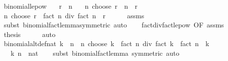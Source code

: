 \begin{isabellebody}
\isamarkupfalse%
\ binomial{\isacharunderscore}{\kern0pt}le{\isacharunderscore}{\kern0pt}pow{\isacharcolon}{\kern0pt}\isanewline
\ \ \ {\isachardoublequoteopen}r\ {\isasymle}\ n{\isachardoublequoteclose}\isanewline
\ \ \ {\isachardoublequoteopen}n\ choose\ r\ {\isasymle}\ n\ {\isacharcircum}{\kern0pt}\ r{\isachardoublequoteclose}\isanewline
%
\isadelimproof
%
\endisadelimproof
%
\isatagproof
{}\isamarkupfalse%
\ {\isacharminus}{\kern0pt}\isanewline
\ \ \isamarkupfalse%
\ {\isachardoublequoteopen}n\ choose\ r\ {\isasymle}\ fact\ n\ div\ fact\ {\isacharparenleft}{\kern0pt}n\ {\isacharminus}{\kern0pt}\ r{\isacharparenright}{\kern0pt}{\isachardoublequoteclose}\isanewline
\ \ \ \ \isamarkupfalse%
\ assms\ \isamarkupfalse%
\ {\isacharparenleft}{\kern0pt}subst\ binomial{\isacharunderscore}{\kern0pt}fact{\isacharunderscore}{\kern0pt}lemma{\isacharbrackleft}{\kern0pt}symmetric{\isacharbrackright}{\kern0pt}{\isacharparenright}{\kern0pt}\ auto\isanewline
\ \ \isamarkupfalse%
\ fact{\isacharunderscore}{\kern0pt}div{\isacharunderscore}{\kern0pt}fact{\isacharunderscore}{\kern0pt}le{\isacharunderscore}{\kern0pt}pow\ {\isacharbrackleft}{\kern0pt}OF\ assms{\isacharbrackright}{\kern0pt}\ \isamarkupfalse%
\ {\isacharquery}{\kern0pt}thesis\isanewline
\ \ \ \ \isamarkupfalse%
\ auto\isanewline
{}\isamarkupfalse%
%
\endisatagproof
{\isafoldproof}%
%
\isadelimproof
\isanewline
%
\endisadelimproof
\isanewline
{}\isamarkupfalse%
\ binomial{\isacharunderscore}{\kern0pt}altdef{\isacharunderscore}{\kern0pt}nat{\isacharcolon}{\kern0pt}\ {\isachardoublequoteopen}k\ {\isasymle}\ n\ {\isasymLongrightarrow}\ n\ choose\ k\ {\isacharequal}{\kern0pt}\ fact\ n\ div\ {\isacharparenleft}{\kern0pt}fact\ k\ {\isacharasterisk}{\kern0pt}\ fact\ {\isacharparenleft}{\kern0pt}n\ {\isacharminus}{\kern0pt}\ k{\isacharparenright}{\kern0pt}{\isacharparenright}{\kern0pt}{\isachardoublequoteclose}\isanewline
\ \ \ k\ n\ {\isacharcolon}{\kern0pt}{\isacharcolon}{\kern0pt}\ nat\isanewline
%
\isadelimproof
\ \ %
\endisadelimproof
%
\isatagproof
{}\isamarkupfalse%
\ {\isacharparenleft}{\kern0pt}subst\ binomial{\isacharunderscore}{\kern0pt}fact{\isacharunderscore}{\kern0pt}lemma\ {\isacharbrackleft}{\kern0pt}symmetric{\isacharbrackright}{\kern0pt}{\isacharparenright}{\kern0pt}\ auto%
\endisatagproof
{\isafoldproof}%
%
\isadelimproof
\isanewline
%
\endisadelimproof
\isanewline
{}\isamarkupfalse%

\end{isabellebody}
